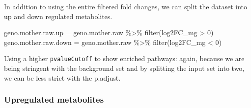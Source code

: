 \documentclass[
  24px,
  letterpaper,
  DIV=11,
  numbers=noendperiod]{scrartcl}
\newenvironment{Shaded}{\begin{snugshade}}{\end{snugshade}}
\newcommand{\AttributeTok}[1]{\textcolor[rgb]{0.40,0.45,0.13}{#1}}
\newcommand{\DecValTok}[1]{\textcolor[rgb]{0.68,0.00,0.00}{#1}}
\newcommand{\FloatTok}[1]{\textcolor[rgb]{0.68,0.00,0.00}{#1}}
\newcommand{\FunctionTok}[1]{\textcolor[rgb]{0.28,0.35,0.67}{#1}}
\newcommand{\NormalTok}[1]{\textcolor[rgb]{0.00,0.23,0.31}{#1}}
\newcommand{\OtherTok}[1]{\textcolor[rgb]{0.00,0.23,0.31}{#1}}
\newcommand{\SpecialCharTok}[1]{\textcolor[rgb]{0.37,0.37,0.37}{#1}}
\begin{document}
In addition to using the entire filtered fold changes, we can split the
dataset into up and down regulated metabolites.

\begin{Shaded}
\begin{Highlighting}[]
\NormalTok{geno.mother.raw.up }\OtherTok{=}\NormalTok{ geno.mother.raw }\SpecialCharTok{\%\textgreater{}\%} \FunctionTok{filter}\NormalTok{(log2FC\_mg }\SpecialCharTok{\textgreater{}} \DecValTok{0}\NormalTok{)}
\NormalTok{geno.mother.raw.down }\OtherTok{=}\NormalTok{ geno.mother.raw }\SpecialCharTok{\%\textgreater{}\%} \FunctionTok{filter}\NormalTok{(log2FC\_mg }\SpecialCharTok{\textless{}} \DecValTok{0}\NormalTok{)}
\end{Highlighting}
\end{Shaded}

Using a higher \texttt{pvalueCutoff} to show enriched pathways: again,
because we are being stringent with the background set and by splitting
the input set into two, we can be less strict with the p.adjust.

\hypertarget{upregulated-metabolites}{%
\subsubsection{Upregulated metabolites}\label{upregulated-metabolites}}

\begin{Shaded}
\end{Shaded}
\end{document}
